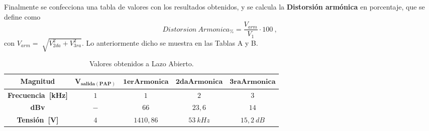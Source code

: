       Finalmente se confecciona una tabla de valores con los resultados obtenidos, y se calcula la 
      \textbf{Distorsión armónica} en porcentaje, que se define como 
        \begin{equation}
          Distorsion~Armonica_{\%}= \dfrac{V_{arm}}{V_{1}} \cdot 100~,
          \label{eqn:DistorsionArmonica}
        \end{equation}
      con $V_{arm}=\sqrt[]{V_{2da}^2+V_{3ra}^2}$. Lo anteriormente dicho se muestra en las 
      Tablas A y B.

      \begin{table}[H]
      \centering
        \begin{tabular}{ccccc} \hline \hline
          \textbf{Magnitud}            &   $\mathbf{V_{salida(PAP)}}$  &  $\mathbf{1erArmonica}$  & $\mathbf{2daArmonica}$  & $\mathbf{3raArmonica}$\\ \hline
          \textbf{Frecuencia~[kHz]}    &   $1$                         &    $1$                   &   $2$                   & $3$ \\
          \textbf{dBv}                 &   $-$                        &    $66$                  &   $23,6$                & $14$ \\
          \textbf{Tensión~[V]}         &   $4$                         &    $1410,86$             &   $53~kHz$              & $15,2~dB$\\ \hline \hline
          \end{tabular}
          \caption{Valores obtenidos a Lazo Abierto.}
          \label{tab:Exp7DistArmLA}
      \end{table}

